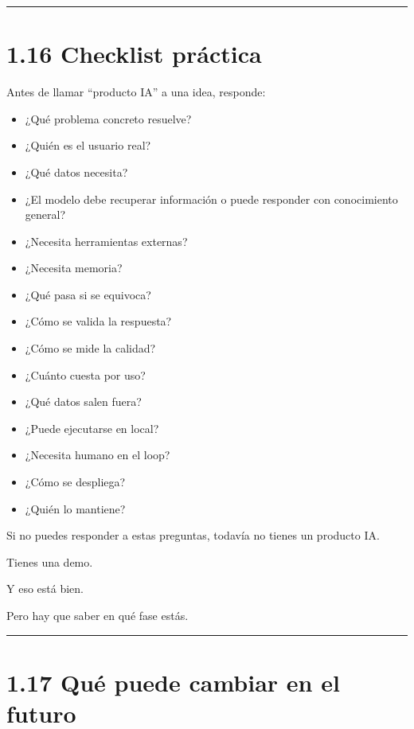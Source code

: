 \begin{center}\rule{0.5\linewidth}{0.5pt}\end{center}

\section{1.16 Checklist práctica}\label{checklist-pruxe1ctica}

Antes de llamar ``producto IA'' a una idea, responde:

\begin{itemize}
\tightlist
\item
  ¿Qué problema concreto resuelve?
\item
  ¿Quién es el usuario real?
\item
  ¿Qué datos necesita?
\item
  ¿El modelo debe recuperar información o puede responder con
  conocimiento general?
\item
  ¿Necesita herramientas externas?
\item
  ¿Necesita memoria?
\item
  ¿Qué pasa si se equivoca?
\item
  ¿Cómo se valida la respuesta?
\item
  ¿Cómo se mide la calidad?
\item
  ¿Cuánto cuesta por uso?
\item
  ¿Qué datos salen fuera?
\item
  ¿Puede ejecutarse en local?
\item
  ¿Necesita humano en el loop?
\item
  ¿Cómo se despliega?
\item
  ¿Quién lo mantiene?
\end{itemize}

Si no puedes responder a estas preguntas, todavía no tienes un producto
IA.

Tienes una demo.

Y eso está bien.

Pero hay que saber en qué fase estás.

\begin{center}\rule{0.5\linewidth}{0.5pt}\end{center}

\section{1.17 Qué puede cambiar en el
futuro}\label{quuxe9-puede-cambiar-en-el-futuro}

